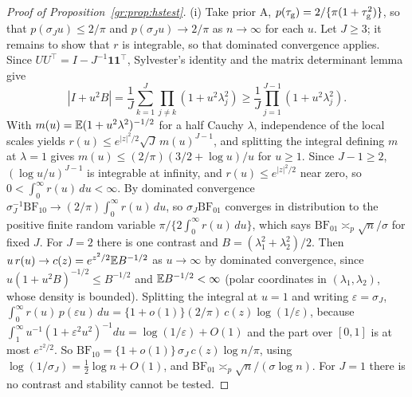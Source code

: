 \begin{proof}[Proof of Proposition~\ref{gr:prop:hstest}]
(i) Take prior A, $p(\tau_{\mathrm{g}})=2/\{\pi(1+\tau_{\mathrm{g}}^2)\}$, so that $p(\sigma_Ju)\le2/\pi$ and $p(\sigma_Ju)\to2/\pi$ as $n\to\infty$ for each $u$. Let $J\ge3$; it remains to show that $r$ is integrable, so that dominated convergence applies. Since $UU^{\top}=I-J^{-1}\mathbf 1\mathbf 1^{\top}$, Sylvester's identity and the matrix determinant lemma give
\[
|I+u^2B|=\frac1J\sum_{k=1}^J\prod_{j\ne k}(1+u^2\lambda_j^2)\ge\frac1J\prod_{j=1}^{J-1}(1+u^2\lambda_j^2).
\]
With $m(u)=\mathbb{E}(1+u^2\lambda^2)^{-1/2}$ for a half Cauchy $\lambda$, independence of the local scales yields $r(u)\le e^{|z|^2/2}\sqrt J\,m(u)^{J-1}$, and splitting the integral defining $m$ at $\lambda=1$ gives $m(u)\le(2/\pi)(3/2+\log u)/u$ for $u\ge1$. Since $J-1\ge2$, $(\log u/u)^{J-1}$ is integrable at infinity, and $r(u)\le e^{|z|^2/2}$ near zero, so $0<\int_0^\infty r(u)\,du<\infty$. By dominated convergence $\sigma_J^{-1}\mathrm{BF}_{10}\to(2/\pi)\int_0^\infty r(u)\,du$, so $\sigma_J\mathrm{BF}_{01}$ converges in distribution to the positive finite random variable $\pi/\{2\int_0^\infty r(u)\,du\}$, which says $\mathrm{BF}_{01}\asymp_p\sqrt n/\sigma$ for fixed $J$. For $J=2$ there is one contrast and $B=(\lambda_1^2+\lambda_2^2)/2$. Then $u\,r(u)\to c(z)=e^{z^2/2}\mathbb{E} B^{-1/2}$ as $u\to\infty$ by dominated convergence, since $u(1+u^2B)^{-1/2}\le B^{-1/2}$ and $\mathbb{E} B^{-1/2}<\infty$ (polar coordinates in $(\lambda_1,\lambda_2)$, whose density is bounded). Splitting the integral at $u=1$ and writing $\varepsilon=\sigma_J$, $\int_0^\infty r(u)\,p(\varepsilon u)\,du=\{1+o(1)\}(2/\pi)\,c(z)\log(1/\varepsilon)$, because $\int_1^\infty u^{-1}(1+\varepsilon^2u^2)^{-1}du=\log(1/\varepsilon)+O(1)$ and the part over $[0,1]$ is at most $e^{z^2/2}$. So $\mathrm{BF}_{10}=\{1+o(1)\}\,\sigma_J\,c(z)\log n/\pi$, using $\log(1/\sigma_J)=\tfrac12\log n+O(1)$, and $\mathrm{BF}_{01}\asymp_p\sqrt n/(\sigma\log n)$. For $J=1$ there is no contrast and stability cannot be tested.


\end{proof}
